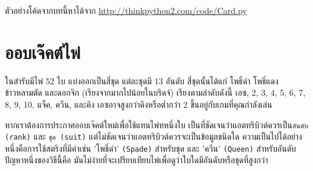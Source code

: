 ตัวอย่างโค้ดจากบทนี้หาได้จาก \url{http://thinkpython2.com/code/Card.py}

\section{ออบเจ๊คต์ไพ่} %


ในสำรับมีไพ่ 52 ใบ แบ่งออกเป็นสี่ชุด แต่ละชุดมี 13 อันดับ สี่ชุดนั้นได้แก่ โพธิ์ดำ โพธิ์แดง ข้าวหลามตัด และดอกจิก (เรียงจากมากไปน้อยในบริดจ์)
เรียงตามลำดับดังนี้ เอซ, 2, 3, 4, 5, 6, 7, 8, 9, 10, แจ็ค, ควีน, และคิง เอซอาจสูงกว่าคิงหรือต่ำกว่า 2 ขึ้นอยู่กับเกมที่คุณกำลังเล่น


หากเราต้องการประกาศออบเจ๊คต์ใหม่เพื่อใช้แทนไพ่ทหนึ่งใบ เป็นที่ชัดเจนว่าแอตทริบิวต์ควรเป็น{\tt อันดับ (rank)} และ {\tt ชุด (suit)} 
แต่ไม่ชัดเจนว่าแอตทริบิวต์ควรจะเป็นข้อมูลชนิดใด ความเป็นไปได้อย่างหนึ่งคือการใช้สตริงที่มีคำเช่น 
'โพธิ์ดำ' \verb"(Spade)" สำหรับชุด และ 'ควีน' \verb"(Queen)" สำหรับอันดับ ปัญหาหนึ่งของวิธีนี้คือ มันไม่ง่ายที่จะเปรียบเทียบไพ่เพื่อดูว่าใบใดมีอันดับหรือชุดที่สูงกว่า



